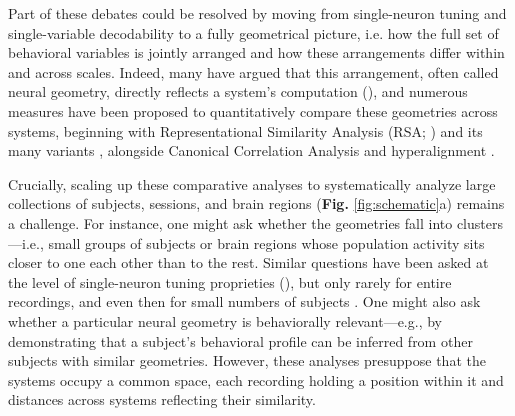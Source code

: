 Part of these debates could be resolved by moving from single-neuron tuning and single-variable decodability to a fully geometrical picture, i.e. how the full set of behavioral variables is jointly arranged and how these arrangements differ within and across scales. Indeed, many have argued that this arrangement, often called neural geometry, directly reflects a system's computation (\cite{bernardi,courellis2024,nogueira2026, fascianelli2024neural, pagan2025, HarveyWilliamsDecoding}), and numerous measures have been proposed to quantitatively compare these geometries across systems, beginning with Representational Similarity Analysis (RSA; \cite{Kriegeskorte2008_frontiers}) and its many variants \parencite[see][for a review]{kriegeskorte2019peeling}, alongside Canonical Correlation Analysis \parencite[CCA;][]{Raghu2017,gallego2020long} and hyperalignment \parencite{haxby2011common,haxby2020hyperalignment}. %

Crucially, scaling up these comparative analyses to systematically analyze large collections of subjects, sessions, and brain regions (\textbf{Fig.} \ref{fig:schematic}a) remains a challenge.
For instance, one might ask whether the geometries fall into clusters---i.e., small groups of subjects or brain regions whose population activity sits closer to one each other than to the rest. Similar questions have been asked at the level of single-neuron tuning proprieties (\cite{hirokawa2019,posani2026}), but only rarely for entire recordings, and even then for small numbers of subjects \parencite{safaie2023preserved,Chen2021,gallego2020long}. 
One might also ask whether a particular neural geometry is behaviorally relevant---e.g., by demonstrating that a subject's behavioral profile can be inferred from other subjects with similar geometries. 
However, these analyses presuppose that the systems occupy a common space, each recording holding a position within it and distances across systems reflecting their similarity.

